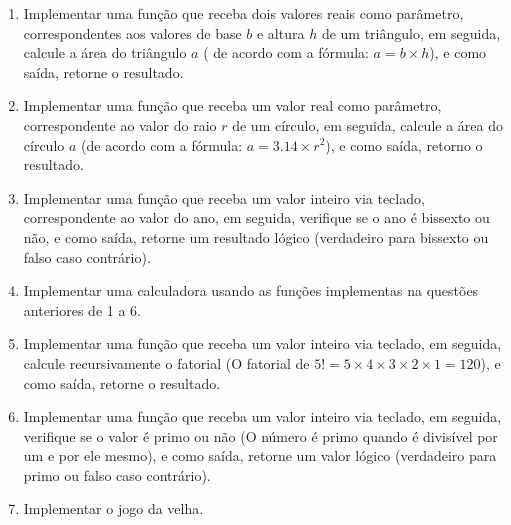 \documentclass[11pt]{article}
\begin{document}
\begin{enumerate}
	\item Implementar uma função que receba dois valores reais como parâmetro, correspondentes aos
	valores de base $b$ e altura $h$ de um triângulo, em seguida, calcule a área do triângulo $a$ ( de
	acordo com a fórmula: $a =b \times h$), e como saída, retorne o resultado.
	
	\item Implementar uma função que receba um valor real como parâmetro, correspondente ao valor
	do raio $r$ de um círculo, em seguida, calcule a área do círculo $a$ (de acordo com a fórmula:
	$a = 3.14 × r^{2}$), e como saída, retorno o resultado.
	
	\item Implementar uma função que receba um valor inteiro via teclado, correspondente ao valor do
	ano, em seguida, verifique se o ano é bissexto ou não, e como saída, retorne um resultado lógico
	(verdadeiro para bissexto ou falso caso contrário).
	
	\item  Implementar uma calculadora usando as funções implementas na questões anteriores de 1 a 6.
	
	\item Implementar uma função que receba um valor inteiro via teclado, em seguida, calcule
	recursivamente o fatorial (O fatorial de $5! = 5 \times 4 \times 3 \times 2 \times 1 = 120$), e como saída, retorne o
	resultado.
	
	\item  Implementar uma função que receba um valor inteiro via teclado, em seguida, verifique se o valor
	é primo ou não (O número é primo quando é divisível por um e por ele mesmo), e como saída,
	retorne um valor lógico (verdadeiro para primo ou falso caso contrário).
	
	\item Implementar o jogo da velha.
\end{enumerate}
\end{document}
